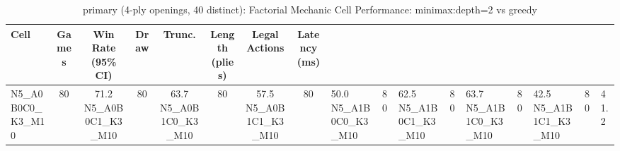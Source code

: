 \begin{table}[htbp]
\centering
\caption{primary (4-ply openings, 40 distinct): Factorial Mechanic Cell Performance: minimax:depth=2 vs greedy}
\label{tab:ablation_cells}
\begin{tabular}{lccccccc}
\toprule
Cell & Games & Win Rate (95\% CI) & Draw & Trunc. & Length (plies) & Legal Actions & Latency (ms) \\
\midrule
N5\_A0B0C0\_K3\_M10 & 80 & 71.2%
N5\_A0B0C1\_K3\_M10 & 80 & 63.7%
N5\_A0B1C0\_K3\_M10 & 80 & 57.5%
N5\_A0B1C1\_K3\_M10 & 80 & 50.0%
N5\_A1B0C0\_K3\_M10 & 80 & 62.5%
N5\_A1B0C1\_K3\_M10 & 80 & 63.7%
N5\_A1B1C0\_K3\_M10 & 80 & 42.5%
N5\_A1B1C1\_K3\_M10 & 80 & 41.2%
\bottomrule
\end{tabular}
\end{table}
